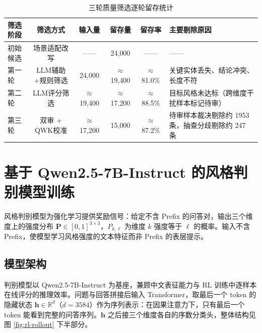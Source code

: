 \documentclass[fontset=fandol,type=master,campus=shenzhen,etitleauto=true]{hithesisbook}
\begin{document}
\begin{table}[htbp]
\centering
\caption{三轮质量筛选逐轮留存统计}
\label{tab:style-data-dist}
\small
\setlength{\tabcolsep}{4pt}
\renewcommand{\arraystretch}{1.1}
\begin{tabular}{l c c c c p{4.2cm}}
\toprule
\textbf{筛选阶段} & \textbf{筛选方式} & \textbf{输入量} & \textbf{留存量} & \textbf{留存率} & \textbf{主要剔除原因} \\
\midrule
初始候选   & 场景适配改写  &  ——   & 24{,}000 &  ——    &  —— \\
第一轮     & LLM辅助+规则筛选 & 24{,}000 & $\approx$19{,}400 & $\approx$81.0\% & 关键实体丢失、结论冲突、长度不符 \\
第二轮     & LLM评分筛选   & $\approx$19{,}400 & $\approx$17{,}200 & $\approx$88.5\% & 目标风格未达标（跨维度干扰样本标记待审） \\
第三轮     & 双审 + QWK校准 & $\approx$17{,}200 & 15{,}000 & $\approx$87.2\% & 待审样本裁决剔除约 1953 条，抽查分歧剔除约 247 条 \\
\bottomrule
\end{tabular}
\end{table}

\section{基于 Qwen2.5-7B-Instruct 的风格判别模型训练}\label{ux57faux4e8e-qwen2.5-7b-ux7684ux98ceux683cux5224ux522bux6a21ux578bux8badux7ec3}

风格判别模型为强化学习提供奖励信号：给定不含 Prefix 的问答对，输出三个维度上的强度分布 $\mathbf{P} \in [0,1]^{3 \times 3}$，$P_{k,\ell}$ 为维度 $k$ 强度等于 $\ell$ 的概率。输入不含 Prefix，使模型学习风格强度的文本特征而非 Prefix 的表层提示。

\subsection{模型架构}\label{ux6a21ux578bux67b6ux6784ux8bbeux8ba1}

判别模型以 Qwen2.5-7B-Instruct 为基座，兼顾中文表征能力与 RL 训练中逐样本在线评分的推理效率。问题与回答拼接后输入 Transformer，取最后一个 token 的隐藏状态 $\mathbf{h} \in \mathbb{R}^{d}$（$d = 3584$）作为序列表示：在因果注意力下，只有最后一个 token 能看到完整的问答序列。$\mathbf{h}$ 之后接三个维度各自的序数分类头，整体结构见图 \ref{fig:rl-rollout} 下半部分。
\end{document}
